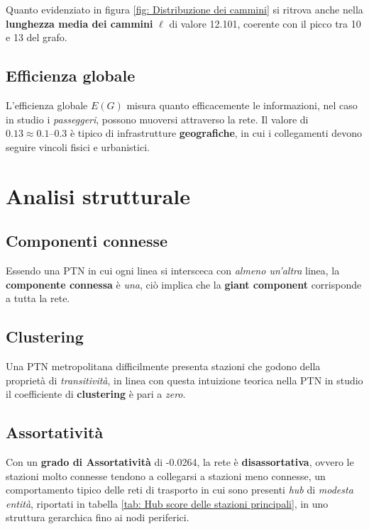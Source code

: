 Quanto evidenziato in figura \ref{fig: Distribuzione dei cammini} si ritrova anche nella \textbf{lunghezza media dei cammini} $\ell$ di valore 12.101, coerente con il picco tra 10 e 13 del grafo.

\subsection{Efficienza globale}
L'efficienza globale $E(G)$ misura quanto efficacemente le informazioni, nel caso in studio i \textit{passeggeri}, possono muoversi attraverso la rete. Il valore di $0.13 \approx 0.1\text{--}0.3$ è tipico di infrastrutture \textbf{geografiche}, in cui i collegamenti devono seguire vincoli fisici e urbanistici.

\section{Analisi strutturale}

\subsection{Componenti connesse}
Essendo una PTN in cui ogni linea si intersceca con \textit{almeno un'altra} linea, la \textbf{componente connessa} è \textit{una}, ciò implica che la \textbf{giant component} corrisponde a tutta la rete.

\subsection{Clustering}
Una PTN metropolitana difficilmente presenta stazioni che godono della proprietà di \textit{transitività}, in linea con questa intuizione teorica nella PTN in studio il coefficiente di \textbf{clustering} è pari a \textit{zero}.

\subsection{Assortatività}
Con un \textbf{grado di Assortatività} di -0.0264, la rete è \textbf{disassortativa}, ovvero le stazioni molto connesse tendono a collegarsi a stazioni meno connesse, un comportamento tipico delle reti di trasporto in cui sono presenti \textit{hub} di \textit{modesta entità}, riportati in tabella \ref{tab: Hub score delle stazioni principali}, in uno struttura gerarchica fino ai nodi periferici.

